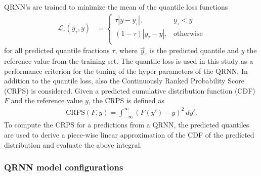 \documentclass[amt, manuscript]{copernicus}
\newcommand{\y}{\vec{y}}
\begin{document}
QRNN's are trained to minimize the mean of the quantile loss functions
%
\begin{align}
  \mathcal{L}_\tau(y_\tau, y) &=
  \begin{cases}
    \tau|y - y_\tau|, & y_\tau < y \\ (1 - \tau)|y_\tau - y|, & \text{otherwise}
    \\
  \end{cases}
\end{align}
%
for all predicted quantile fractions $\tau$, where $\y_\tau$ is the predicted
quantile and $y$ the reference value from the training set. The quantile loss is
used in this study as a performance criterion for the tuning of the hyper
parameters of the QRNN. In addition to the quantile loss, also the Continuously
Ranked Probability Score (CRPS) is considered. Given a predicted cumulative
distribution function (CDF) $F$ and the reference value $y$, the CRPS is defined as
%
\begin{align}
  \text{CRPS}(F, y) = \int_{-\infty}^{\infty} \left (F(y') - y\right )^2\: dy'.
\end{align}
%
To compute the CRPS for a predictions from a QRNN, the predicted quantiles are
used to derive a piece-wise linear approximation of the CDF of the predicted
distribution and evaluate the above integral.





\subsubsection{ QRNN model configurations}
%
\label{QRNN_models}
\end{document}
